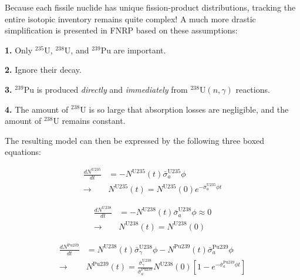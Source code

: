 \documentclass[compact]{ne630handout}
\begin{document}
\colnext


Because each fissile nuclide has unique fission-product distributions,
tracking the entire isotopic inventory remains quite complex!
A much more drastic simplification is presented in FNRP based on these assumptions:

\vspace{5pt}

\textbf{1.} Only ${}^{235}$U, ${}^{238}$U, and ${}^{239}$Pu are important.
\vspace{2pt}


\textbf{2.} Ignore their decay.
\vspace{2pt}

\textbf{3.} ${}^{239}$Pu is produced \emph{directly} and \emph{immediately}
from ${}^{238}$U$(n,\gamma)$ reactions.
\vspace{2pt}

\textbf{4.} The amount of ${}^{238}$U is so large that absorption losses
are negligible, and the amount of ${}^{238}$U remains constant.

\vspace{5pt}

The resulting model can then be expressed by the following three boxed equations:

\begin{equation*}
\tag{10.27 $\rightarrow$ 10.31}
\begin{split}
\frac{dN^{\text{U}235}}{dt} &=  -N^{\text{U}235}(t) \bar{\sigma}^{\text{U}235}_a \phi \\
 \longrightarrow \, & \boxed{N^{\text{U}235}(t) = N^{\text{U}235}(0) e^{-\bar{\sigma}^{\text{U}235}_a \phi t}}
\end{split}
\end{equation*}

\begin{equation*}
\tag{10.27 $\rightarrow$  10.34}
\begin{split}
\frac{dN^{\text{U}238}}{dt} &= -N^{\text{U}238}(t) \bar{\sigma}^{\text{U}238}_a \phi \approx 0 \\
 \longrightarrow \, & \boxed{N^{\text{U}238}(t) = N^{\text{U}238}(0)}
\end{split}
\end{equation*}

\begin{equation*}
\tag{10.30 $\rightarrow$  10.37}
\begin{split}
\frac{dN^{\text{Pu}239}}{dt} &=
 N^{\text{U}238}(t) \bar{\sigma}^{\text{U}238}_{\gamma} \phi
 - N^{\text{Pu}239}(t) \bar{\sigma}^{\text{Pu}239}_a \phi \\
\longrightarrow \, & \boxed{N^{\text{Pu}239}(t)
  = \frac{\bar{\sigma}^{\text{U}238}_{\gamma}}{\bar{\sigma}^{\text{Pu}239}_a}
    N^{\text{U}238}(0) \left [1 - e^{-\bar{\sigma}^{\text{Pu}239}_a \phi t} \right ]}
\end{split}
\end{equation*}
\end{document}
